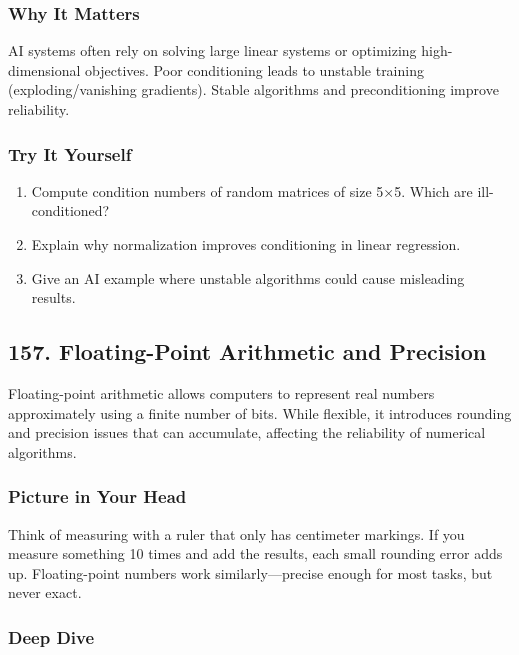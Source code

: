 \documentclass[
  letterpaper,
  DIV=11,
  numbers=noendperiod]{scrreprt}
\providecommand{\tightlist}{%
  \setlength{\itemsep}{0pt}\setlength{\parskip}{0pt}}
\begin{document}
\subsubsection{Why It Matters}\label{why-it-matters-53}

AI systems often rely on solving large linear systems or optimizing
high-dimensional objectives. Poor conditioning leads to unstable
training (exploding/vanishing gradients). Stable algorithms and
preconditioning improve reliability.

\subsubsection{Try It Yourself}\label{try-it-yourself-155}

\begin{enumerate}
\def\labelenumi{\arabic{enumi}.}
\tightlist
\item
  Compute condition numbers of random matrices of size 5×5. Which are
  ill-conditioned?
\item
  Explain why normalization improves conditioning in linear regression.
\item
  Give an AI example where unstable algorithms could cause misleading
  results.
\end{enumerate}

\subsection{157. Floating-Point Arithmetic and
Precision}\label{floating-point-arithmetic-and-precision}

Floating-point arithmetic allows computers to represent real numbers
approximately using a finite number of bits. While flexible, it
introduces rounding and precision issues that can accumulate, affecting
the reliability of numerical algorithms.

\subsubsection{Picture in Your Head}\label{picture-in-your-head-156}

Think of measuring with a ruler that only has centimeter markings. If
you measure something 10 times and add the results, each small rounding
error adds up. Floating-point numbers work similarly---precise enough
for most tasks, but never exact.

\subsubsection{Deep Dive}\label{deep-dive-156}
\end{document}
